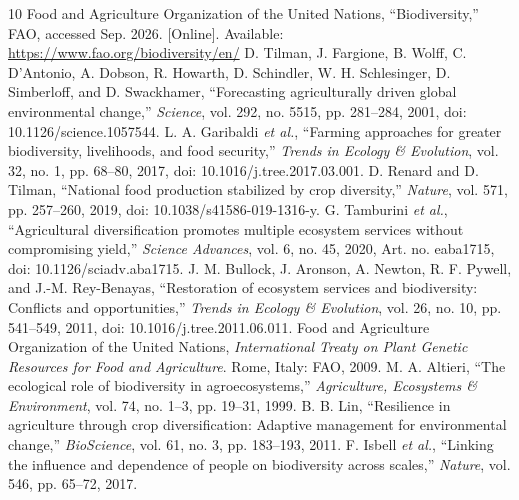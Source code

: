 \documentclass[conference]{IEEEtran}
\begin{document}
\begin{thebibliography}{10}
 Food and Agriculture Organization of the United Nations, ``Biodiversity,'' FAO, accessed Sep. 2026. [Online]. Available: \url{https://www.fao.org/biodiversity/en/}
 D. Tilman, J. Fargione, B. Wolff, C. D'Antonio, A. Dobson, R. Howarth, D. Schindler, W. H. Schlesinger, D. Simberloff, and D. Swackhamer, ``Forecasting agriculturally driven global environmental change,'' \emph{Science}, vol. 292, no. 5515, pp. 281--284, 2001, doi: 10.1126/science.1057544.
 L. A. Garibaldi \emph{et al.}, ``Farming approaches for greater biodiversity, livelihoods, and food security,'' \emph{Trends in Ecology \& Evolution}, vol. 32, no. 1, pp. 68--80, 2017, doi: 10.1016/j.tree.2017.03.001.
 D. Renard and D. Tilman, ``National food production stabilized by crop diversity,'' \emph{Nature}, vol. 571, pp. 257--260, 2019, doi: 10.1038/s41586-019-1316-y.
 G. Tamburini \emph{et al.}, ``Agricultural diversification promotes multiple ecosystem services without compromising yield,'' \emph{Science Advances}, vol. 6, no. 45, 2020, Art. no. eaba1715, doi: 10.1126/sciadv.aba1715.
 J. M. Bullock, J. Aronson, A. Newton, R. F. Pywell, and J.-M. Rey-Benayas, ``Restoration of ecosystem services and biodiversity: Conflicts and opportunities,'' \emph{Trends in Ecology \& Evolution}, vol. 26, no. 10, pp. 541--549, 2011, doi: 10.1016/j.tree.2011.06.011.
 Food and Agriculture Organization of the United Nations, \emph{International Treaty on Plant Genetic Resources for Food and Agriculture}. Rome, Italy: FAO, 2009.
 M. A. Altieri, ``The ecological role of biodiversity in agroecosystems,'' \emph{Agriculture, Ecosystems \& Environment}, vol. 74, no. 1--3, pp. 19--31, 1999.
 B. B. Lin, ``Resilience in agriculture through crop diversification: Adaptive management for environmental change,'' \emph{BioScience}, vol. 61, no. 3, pp. 183--193, 2011.
 F. Isbell \emph{et al.}, ``Linking the influence and dependence of people on biodiversity across scales,'' \emph{Nature}, vol. 546, pp. 65--72, 2017.
\end{thebibliography}
\end{document}
